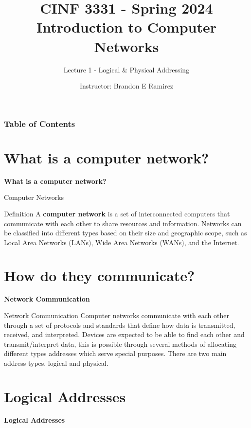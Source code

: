 \documentclass[10pt, aspectratio=43]{beamer}
\title[School of Computer \& Network Administration] %
{CINF 3331 - Spring 2024\\Introduction to Computer Networks}
\subtitle{Lecture 1 - Logical \& Physical Addressing}
\author[Galveston College] %
{Instructor: Brandon E Ramirez}
\date{}
\begin{document}
\frame{\titlepage}

\begin{frame}
\frametitle{Table of Contents}
\tableofcontents
\end{frame}


\section{What is a computer network?}
\begin{frame}{}
    \centering
    \huge \textbf{What is a computer network?}
\end{frame}

\begin{frame}{Computer Networks}
    \begin{block}{Definition}
        A \textbf{computer network} is a set of interconnected computers that communicate with each other to share resources and information. Networks can be classified into different types based on their size and geographic scope, such as Local Area Networks (LANs), Wide Area Networks (WANs), and the Internet.
    \end{block}
\end{frame}




\section{How do they communicate?}
\begin{frame}{}
    \centering
    \huge \textbf{Network Communication}
\end{frame}

\begin{frame}{Network Communication}
    Computer networks communicate with each other through a set of protocols and standards that define how data is transmitted, received, and interpreted. Devices are expected to be able to find each other and transmit/interpret data, this is possible through several methods of allocating different types addresses which serve special purposes. There are two main address types, logical and physical.
\end{frame}




\section{Logical Addresses}

\begin{frame}{}
    \centering
    \huge \textbf{Logical Addresses}
\end{frame}
\end{document}

